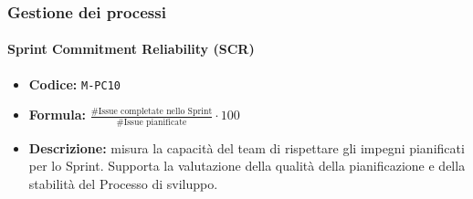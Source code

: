 \documentclass[a4paper,12pt]{article}
\newcommand{\ignoreglossary}{}
\begin{document}
\subsubsection{Gestione dei processi}
\paragraph{\ignoreglossary{Sprint} Commitment Reliability (SCR)}
\begin{itemize}
    \item \textbf{Codice:} \texttt{M-PC10}
    \item \textbf{Formula:} $\frac{\text{\# Issue completate nello Sprint}}{\text{\# Issue pianificate}} \cdot 100$
    \item \textbf{Descrizione:} misura la capacità del team di rispettare gli impegni pianificati per lo Sprint.
    Supporta la valutazione della qualità della pianificazione e della stabilità del Processo di sviluppo.
\end{itemize}
\end{document}
